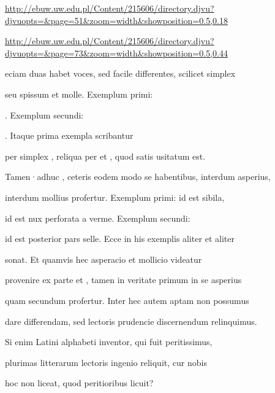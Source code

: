 
\newParkoszpage


{
\url{http://ebuw.uw.edu.pl/Content/215606/directory.djvu?djvuopts=&page=51&zoom=width&showposition=0.5,0.18}

\url{http://ebuw.uw.edu.pl/Content/215606/directory.djvu?djvuopts=&page=73&zoom=width&showposition=0.5,0.44}
}



\fulllines

\indentK {} eciam duas habet voces, sed facile differentes, scilicet  simplex

seu spissum et  molle. Exemplum primi:   

  . Exemplum secundi:    

   . Itaque prima exempla scribantur

per simplex , reliqua per  et , quod satis usitatum est.

\indentK Tamen·adhuc , ceteris eodem modo se habentibus, interdum asperius,

interdum mollius profertur. Exemplum primi:  id est sibila,

 id est nux perforata a verme. Exemplum secundi: 

id est posterior pars selle. Ecce in his exemplis aliter et aliter 

sonat. Et quamvis hec asperacio et mollicio videatur

provenire ex parte  et , tamen in veritate primum  in se asperius

quam secundum profertur. Inter hec autem aptam non possumus

dare differendam, sed lectoris prudencie discernendum relinquimus.

Si enim Latini alphabeti inventor, qui fuit peritissimus,

plurimas  litterarum lectoris ingenio reliquit, cur nobis

hoc non liceat, quod peritioribus licuit?

